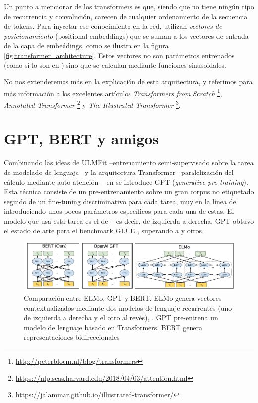 Un punto a mencionar de los transformers es que, siendo que no tiene ningún tipo de recurrencia y convolución, carecen de cualquier ordenamiento de la secuencia de tokens. Para inyectar ese conocimiento en la red, utilizan \emph{vectores de posicionamiento} (positional embeddings) que se suman a los vectores de entrada de la capa de embeddings, como se ilustra en la figura \ref{fig:transformer_architecture}. Estos vectores no son parámetros entrenados (como sí lo son en \bert{}) sino que se calculan mediante funciones sinusoidales.


No nos extenderemos más en la explicación de esta arquitectura, y referimos para más información a los excelentes artículos \emph{Transformers from Scratch} \footnote{\url{http://peterbloem.nl/blog/transformers}}, \emph{Annotated Transformer} \footnote{\url{https://nlp.seas.harvard.edu/2018/04/03/attention.html}} y \emph{The Illustrated Transformer} \footnote{\url{https://jalammar.github.io/illustrated-transformer/}}.


\section{GPT, BERT y amigos}

\label{sec:02_bert}

Combinando las ideas de ULMFit --entrenamiento semi-supervisado sobre la tarea de modelado de lenguaje-- y la arquitectura Transformer --paralelización del cálculo mediante auto-atención -- en \citet{radford2018improving} se introduce GPT (\emph{generative pre-training}). Esta técnica consiste de un pre-entrenamiento sobre un gran corpus no etiquetado seguido de un fine-tuning discriminativo para cada tarea, muy en la línea de \citet{howard-ruder-2018-universal} introduciendo unos pocos parámetros específicos para cada una de estas. El modelo que usa esta tarea es el de  -- es decir, de izquierda a derecha. GPT obtuvo el estado de arte para el benchmark GLUE \cite{wang-etal-2018-glue}, superando a \elmo{} y otros.


\begin{figure}[t]
    \centering
    \includegraphics[width=\textwidth]{img/02/gpt_vs_bert.pdf}
    \caption{Comparación entre ELMo, GPT y BERT. ELMo genera vectores contextualizados mediante dos modelos de lenguaje recurrentes (uno de izquierda a derecha y el otro al revés), . GPT pre-entrena un modelo de lenguaje basado en Transformers. BERT genera representaciones bidireccionales }
    \label{fig:gpt_vs_bert_vs_elmo}
\end{figure}


